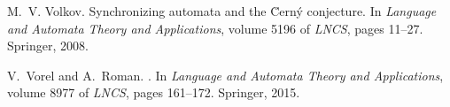 \documentclass[runningheads]{llncs}
\begin{document}
\begin{thebibliography}{10}
M.~V. Volkov.
\newblock Synchronizing automata and the \u{C}ern\'{y} conjecture.
\newblock In {\em Language and Automata Theory and Applications}, volume 5196
  of {\em LNCS}, pages 11--27. Springer, 2008.

V.~Vorel and A.~Roman.
.
\newblock In {\em Language and Automata Theory and Applications}, volume 8977
  of {\em LNCS}, pages 161--172. Springer, 2015.

\end{thebibliography}
\end{document}
